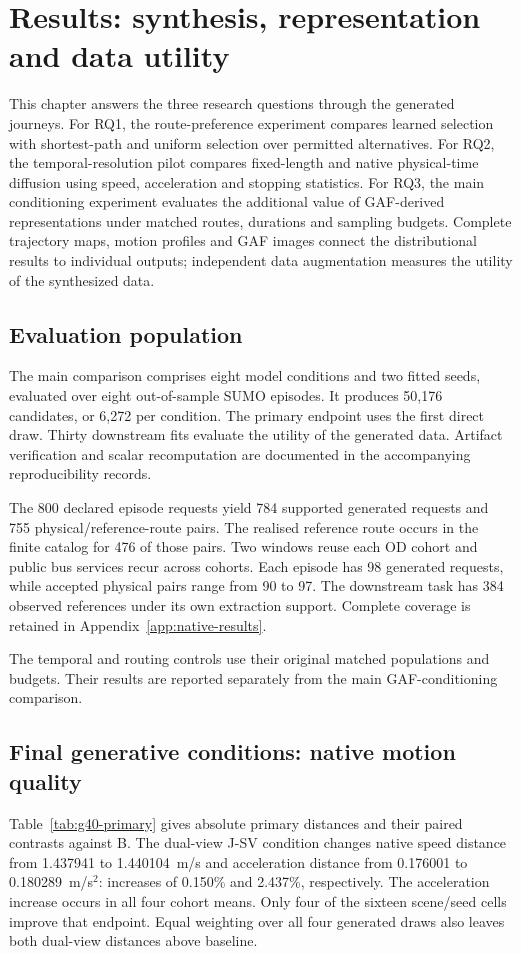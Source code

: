 \chapter{Results: synthesis, representation and data utility}
\label{ch:native-results}

This chapter answers the three research questions through the generated journeys. For RQ1, the route-preference experiment compares learned selection with shortest-path and uniform selection over permitted alternatives. For RQ2, the temporal-resolution pilot compares fixed-length and native physical-time diffusion using speed, acceleration and stopping statistics. For RQ3, the main conditioning experiment evaluates the additional value of GAF-derived representations under matched routes, durations and sampling budgets. Complete trajectory maps, motion profiles and GAF images connect the distributional results to individual outputs; independent data augmentation measures the utility of the synthesized data.

\FloatBarrier
\section{Evaluation population}
The main comparison comprises eight model conditions and two fitted seeds, evaluated over eight out-of-sample SUMO episodes. It produces 50,176 candidates, or 6,272 per condition. The primary endpoint uses the first direct draw. Thirty downstream fits evaluate the utility of the generated data. Artifact verification and scalar recomputation are documented in the accompanying reproducibility records.

The 800 declared episode requests yield 784 supported generated requests and 755 physical/reference-route pairs. The realised reference route occurs in the finite catalog for 476 of those pairs. Two windows reuse each OD cohort and public bus services recur across cohorts. Each episode has 98 generated requests, while accepted physical pairs range from 90 to 97. The downstream task has 384 observed references under its own extraction support. Complete coverage is retained in Appendix~\ref{app:native-results}.

The temporal and routing controls use their original matched populations and budgets. Their results are reported separately from the main GAF-conditioning comparison.


\FloatBarrier
\section{Final generative conditions: native motion quality}
Table~\ref{tab:g40-primary} gives absolute primary distances and their paired contrasts against B. The dual-view J-SV condition changes native speed distance from 1.437941 to 1.440104~m/s and acceleration distance from 0.176001 to 0.180289~m/s$^2$: increases of 0.150\% and 2.437\%, respectively. The acceleration increase occurs in all four cohort means. Only four of the sixteen scene/seed cells improve that endpoint. Equal weighting over all four generated draws also leaves both dual-view distances above baseline.

